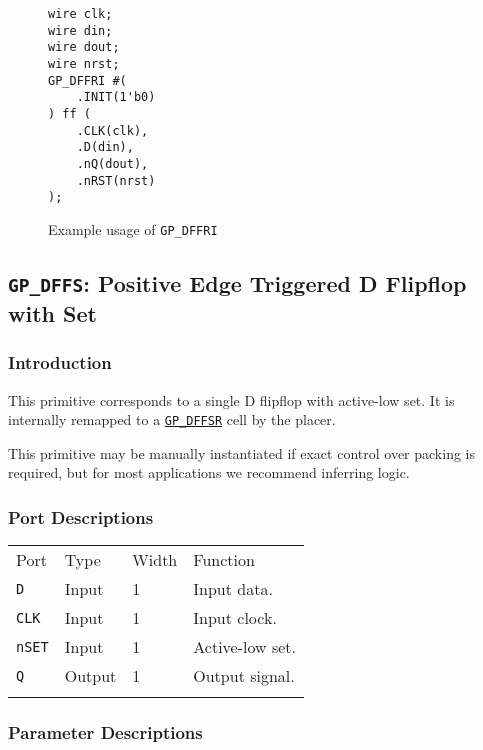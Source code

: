 \documentclass[11pt]{article}
\newcommand{\tokenstyle}[1]{\texttt{#1}}
\newcommand{\whenstyle}[1]{{\fontseries{sb}\selectfont#1}}
\newcommand{\tokenref}[2]{\hyperref[#2]{\tokenstyle{#1}}}
\newcommand{\thinhline}{\Xhline{1\arrayrulewidth}}
\newcommand{\thickhline}{\Xhline{2.5\arrayrulewidth}}
\begin{document}
\begin{figure}[h]
\begin{lstlisting}
wire clk;
wire din;
wire dout;
wire nrst;
GP_DFFRI #(
	.INIT(1'b0)
) ff (
	.CLK(clk),
	.D(din),
	.nQ(dout),
	.nRST(nrst)
);
\end{lstlisting}
\caption{Example usage of \tokenstyle{GP\_DFFRI}}
\label{gp-dffri-example}
\end{figure}


\pagebreak
\subsection{\tokenstyle{GP\_DFFS}: Positive Edge Triggered D Flipflop with Set}
\label{gp-dffs}

\subsubsection{Introduction}
This primitive corresponds to a single D flipflop with active-low set. It is internally remapped to a
\tokenref{GP\_DFFSR}{gp-dffsr} cell by the placer.

This primitive may be manually instantiated if exact control over packing is required, but for most applications we
recommend inferring logic.

\subsubsection{Port Descriptions}

\begin{tabularx}{\textwidth}{lllX}
\thinhline
\whenstyle{Port} & \whenstyle{Type} & \whenstyle{Width} & \whenstyle{Function} \\
\thickhline
\tokenstyle{D} & Input & 1 & Input data. \\
\thinhline
\tokenstyle{CLK} & Input & 1 & Input clock. \\
\thinhline
\tokenstyle{nSET} & Input & 1 & Active-low set. \\
\thinhline
\tokenstyle{Q} & Output & 1 & Output signal. \\
\thinhline
\end{tabularx}

\subsubsection{Parameter Descriptions}
\end{document}
